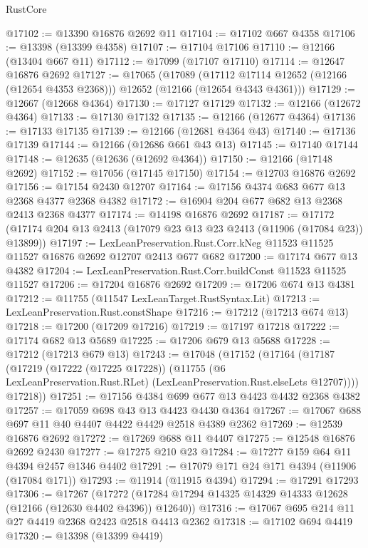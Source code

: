 \begin{lexlean}{RustCore}
\begin{coremodule}
@17102 := @13390 @16876 @2692 @11
@17104 := @17102 @667 @4358
@17106 := @13398 (@13399 @4358)
@17107 := @17104 @17106
@17110 := @12166 (@13404 @667 @11)
@17112 := @17099 (@17107 @17110)
@17114 := @12647 @16876 @2692
@17127 := @17065
    (@17089
      (@17112 @17114 @12652 (@12166 (@12654 @4353 @2368)))
      @12652
      (@12166 (@12654 @4343 @4361)))
@17129 := @12667 (@12668 @4364)
@17130 := @17127 @17129
@17132 := @12166 (@12672 @4364)
@17133 := @17130 @17132
@17135 := @12166 (@12677 @4364)
@17136 := @17133 @17135
@17139 := @12166 (@12681 @4364 @43)
@17140 := @17136 @17139
@17144 := @12166 (@12686 @661 @43 @13)
@17145 := @17140 @17144
@17148 := @12635 (@12636 (@12692 @4364))
@17150 := @12166 (@17148 @2692)
@17152 := @17056 (@17145 @17150)
@17154 := @12703 @16876 @2692
@17156 := @17154 @2430 @12707
@17164 := @17156 @4374 @683 @677 @13 @2368 @4377 @2368 @4382
@17172 := @16904 @204 @677 @682 @13 @2368 @2413 @2368 @4377
@17174 := @14198 @16876 @2692
@17187 := @17172 (@17174 @204 @13 @2413 (@17079 @23 @13 @23 @2413 (@11906 (@17084 @23)) @13899))
@17197 := LexLeanPreservation.Rust.Corr.kNeg
    @11523
    @11525
    @11527
    @16876
    @2692
    @12707
    @2413
    @677
    @682
@17200 := @17174 @677 @13 @4382
@17204 := LexLeanPreservation.Rust.Corr.buildConst @11523 @11525 @11527
@17206 := @17204 @16876 @2692
@17209 := @17206 @674 @13 @4381
@17212 := @11755 (@11547 LexLeanTarget.RustSyntax.Lit)
@17213 := LexLeanPreservation.Rust.constShape
@17216 := @17212 (@17213 @674 @13)
@17218 := @17200 (@17209 @17216)
@17219 := @17197 @17218
@17222 := @17174 @682 @13 @5689
@17225 := @17206 @679 @13 @5688
@17228 := @17212 (@17213 @679 @13)
@17243 := @17048
    (@17152
      (@17164
        (@17187
          (@17219
            (@17222 (@17225 @17228))
            (@11755 (@6 LexLeanPreservation.Rust.RLet) (LexLeanPreservation.Rust.elseLets @12707))))
        @17218))
@17251 := @17156 @4384 @699 @677 @13 @4423 @4432 @2368 @4382
@17257 := @17059 @698 @43 @13 @4423 @4430 @4364
@17267 := @17067 @688 @697 @11 @40 @4407 @4422 @4429 @2518 @4389 @2362
@17269 := @12539 @16876 @2692
@17272 := @17269 @688 @11 @4407
@17275 := @12548 @16876 @2692 @2430
@17277 := @17275 @210 @23
@17284 := @17277 @159 @64 @11 @4394 @2457 @1346 @4402
@17291 := @17079 @171 @24 @171 @4394 (@11906 (@17084 @171))
@17293 := @11914 (@11915 @4394)
@17294 := @17291 @17293
@17306 := @17267
    (@17272 (@17284 @17294 @14325 @14329 @14333 @12628 (@12166 (@12630 @4402 @4396)) @12640))
@17316 := @17067 @695 @214 @11 @27 @4419 @2368 @2423 @2518 @4413 @2362
@17318 := @17102 @694 @4419
@17320 := @13398 (@13399 @4419)

\end{coremodule}
\end{lexlean}

